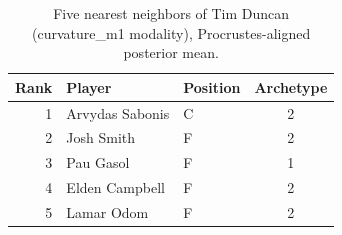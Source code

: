 \begin{table}[htbp]
  \centering\small
  \begin{tabular}{rllc}
    \toprule
    Rank & Player & Position & Archetype \\
    \midrule
    1 & Arvydas Sabonis & C & 2 \\
    2 & Josh Smith & F & 2 \\
    3 & Pau Gasol & F & 1 \\
    4 & Elden Campbell & F & 2 \\
    5 & Lamar Odom & F & 2 \\
    \bottomrule
  \end{tabular}
  \caption{Five nearest neighbors of Tim Duncan (curvature_m1 modality), Procrustes-aligned posterior mean.}
  \label{tab:Tim_Duncan_neighbors_curvature_m1}
\end{table}

